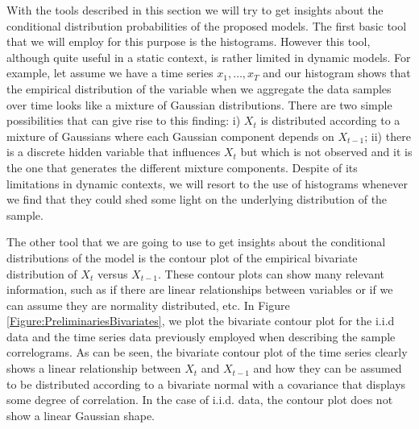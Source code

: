 With the tools described in this section we will try to get insights about the conditional distribution probabilities  of the proposed models. The first basic tool that we will employ for this purpose is the histograms. However this tool, although quite useful in a static context, is rather limited in dynamic models. For example, let assume we have a time series $x_1,\ldots, x_T$ and our histogram shows that the empirical distribution of the variable when we aggregate the data samples over time looks like a mixture of Gaussian distributions. There are two simple possibilities that can give rise to this finding: i)  $X_t$ is distributed according to a mixture of Gaussians where each Gaussian component depends on $X_{t-1}$; ii) there is a discrete hidden variable that influences $X_{t}$ but which is not observed and it is the one that generates the different mixture components. Despite of its limitations in dynamic contexts, we will resort to the use of histograms whenever we find that they could shed some light on the underlying distribution of the sample.

The other tool that we are going to use to get insights about the conditional distributions of the model is the contour plot of the empirical bivariate distribution of $X_t$ versus $X_{t-1}$.  These contour plots can show many relevant information, such as if there are linear relationships between variables or if we can assume they are normality distributed, etc. In Figure \ref{Figure:PreliminariesBivariates}, we plot the bivariate contour plot for the i.i.d data and the time series data previously employed when describing the sample correlograms. As can be seen, the bivariate contour plot of the time series clearly shows a linear relationship between $X_t$ and $X_{t-1}$  and how they can be assumed to be distributed according to a bivariate normal with a covariance that displays some degree of correlation. In the case of i.i.d. data, the contour plot does not show a linear Gaussian shape. 

